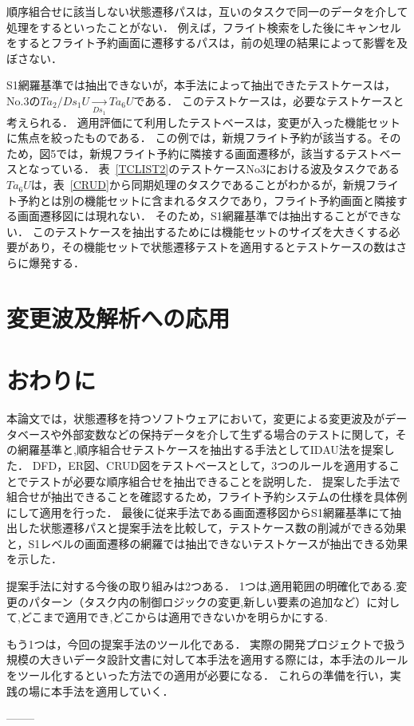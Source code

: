 順序組合せに該当しない状態遷移パスは，互いのタスクで同一のデータを介して処理をするといったことがない．
例えば，フライト検索をした後にキャンセルをするとフライト予約画面に遷移するパスは，前の処理の結果によって影響を及ぼさない．

S1網羅基準では抽出できないが，本手法によって抽出できたテストケースは，No.3の$Ta_2/Ds_1U  \xrightarrow[Ds_1]{} Ta_6U$である．
このテストケースは，必要なテストケースと考えられる．
適用評価にて利用したテストベースは，変更が入った機能セットに焦点を絞ったものである．
この例では，新規フライト予約が該当する。そのため，図5では，新規フライト予約に隣接する画面遷移が，該当するテストベースとなっている．
表~\ref{TCLIST2}のテストケースNo3における波及タスクである$Ta_6U$は，表~\ref{CRUD}から同期処理のタスクであることがわかるが，新規フライト予約とは別の機能セットに含まれるタスクであり，フライト予約画面と隣接する画面遷移図には現れない．
そのため，S1網羅基準では抽出することができない．
このテストケースを抽出するためには機能セットのサイズを大きくする必要があり，その機能セットで状態遷移テストを適用するとテストケースの数はさらに爆発する．

\section{変更波及解析への応用}
\section{おわりに}

本論文では，状態遷移を持つソフトウェアにおいて，変更による変更波及がデータベースや外部変数などの保持データを介して生ずる場合のテストに関して，その網羅基準と,順序組合せテストケースを抽出する手法としてIDAU法を提案した．
DFD，ER図、CRUD図をテストベースとして，3つのルールを適用することでテストが必要な順序組合せを抽出できることを説明した．
提案した手法で組合せが抽出できることを確認するため，フライト予約システムの仕様を具体例にして適用を行った．
最後に従来手法である画面遷移図からS1網羅基準にて抽出した状態遷移パスと提案手法を比較して，テストケース数の削減ができる効果と，S1レベルの画面遷移の網羅では抽出できないテストケースが抽出できる効果を示した．

提案手法に対する今後の取り組みは2つある．
1つは,適用範囲の明確化である.変更のパターン（タスク内の制御ロジックの変更,新しい要素の追加など）に対して,どこまで適用でき,どこからは適用できないかを明らかにする.

もう1つは，今回の提案手法のツール化である．
実際の開発プロジェクトで扱う規模の大きいデータ設計文書に対して本手法を適用する際には，本手法のルールをツール化するといった方法での適用が必要になる．
これらの準備を行い，実践の場に本手法を適用していく．

--------
